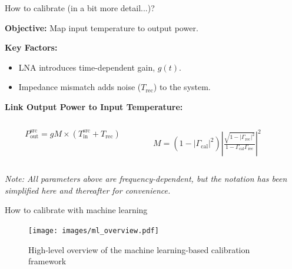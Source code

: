 \documentclass[aspectratio=169]{beamer}
\begin{document}
\begin{frame}{\small{How to calibrate (in a bit more detail...)?}}
	\vspace{-0.5cm}
	\begin{flushleft}
		\textbf{Objective:} Map input temperature to output power.
		\vspace{0.2cm}

		\textbf{Key Factors:}
		\begin{itemize}
			\item LNA introduces time-dependent gain, $g(t)$.
			\item Impedance mismatch adds noise ($T_{\text{rec}}$) to the system.
		\end{itemize}

		\vspace{0.2cm}
		\textbf{Link Output Power to Input Temperature:}
	\end{flushleft}

	\begin{columns}
		\begin{column}{0.5\textwidth}
			{
				\begin{equation}
					P_{\text{out}}^{\text{src}} = g M \times \left( T_{\text{in}}^{\text{src}} + T_{\text{rec}} \right)
				\end{equation}
			}

		\end{column}
		\begin{column}{0.3\textwidth}

			\small $M = \left( 1 - |\Gamma_{\text{cal}}|^2 \right) | \frac{\sqrt{1 - |\Gamma_{\text{rec}}|^2}}{1 - \Gamma_{\text{cal}} \Gamma_{\text{rec}}}|^2$
		\end{column}
	\end{columns}

	\vfill

	\begin{footnotesize}
		\textit{Note: All parameters above are frequency-dependent, but the notation has been simplified here and thereafter for convenience.}
	\end{footnotesize}

\end{frame}

\begin{frame}{\small{How to calibrate with machine learning}}
	\begin{figure}[h]
		\centering
		\texttt{[image: images/ml\_overview.pdf]}
		\caption{High-level overview of the machine learning-based calibration framework}
	\end{figure}
\end{frame}
\end{document}
